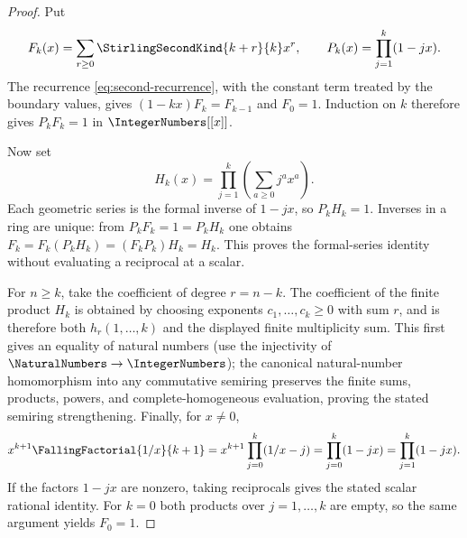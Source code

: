\documentclass[11pt,a4paper,oneside,openany]{book}
\theoremstyle{definition}
\theoremstyle{remark}
\begin{document}
\begin{proof}
Put
\[
 F_k(x)=\sum_{r\ge0}\StirlingSecondKind{k+r}{k}x^r,
 \qquad P_k(x)=\prod_{j=1}^k(1-jx).
\]
The recurrence \cref{eq:second-recurrence}, with the constant term treated by
the boundary values, gives $(1-kx)F_k=F_{k-1}$ and $F_0=1$.  Induction on $k$
therefore gives $P_kF_k=1$ in $\IntegerNumbers[[x]]$.

Now set
\[
 H_k(x)=\prod_{j=1}^k\left(\sum_{a\ge0}j^a x^a\right).
\]
Each geometric series is the formal inverse of $1-jx$, so $P_kH_k=1$.
Inverses in a ring are unique: from $P_kF_k=1=P_kH_k$ one obtains
$F_k=F_k(P_kH_k)=(F_kP_k)H_k=H_k$.  This proves the formal-series identity
without evaluating a reciprocal at a scalar.

For $n\ge k$, take the coefficient of degree $r=n-k$.  The coefficient of
the finite product $H_k$ is obtained by choosing exponents
$c_1,\ldots,c_k\ge0$ with sum $r$, and is therefore both
$h_r(1,\ldots,k)$ and the displayed finite multiplicity sum.  This first
gives an equality of natural numbers (use the injectivity of
$\NaturalNumbers\to\IntegerNumbers$); the canonical natural-number
homomorphism into any commutative semiring preserves the finite sums,
products, powers, and complete-homogeneous evaluation, proving the stated
semiring strengthening.  Finally, for
$x\ne0$,
\[
 x^{k+1}\FallingFactorial{1/x}{k+1}
 =x^{k+1}\prod_{j=0}^k(1/x-j)
 =\prod_{j=0}^k(1-jx)=\prod_{j=1}^k(1-jx).
\]
If the factors $1-jx$ are nonzero, taking reciprocals gives the stated scalar
rational identity.  For $k=0$ both products over $j=1,\ldots,k$ are empty,
so the same argument yields $F_0=1$.
\end{proof}
\end{document}
